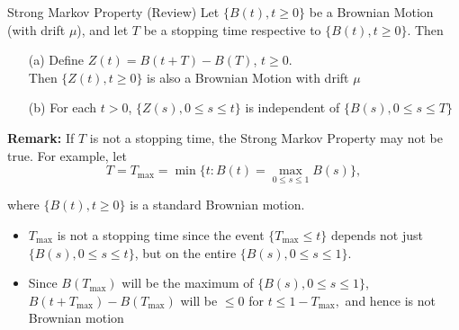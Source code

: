 \documentclass[letterpaper,handout]{beamer}
\begin{document}
\begin{frame}{Strong Markov Property (Review)}
Let $\{B(t),t\ge 0\}$ be a Brownian Motion (with drift $\mu$), and let $T$ be a stopping time respective to $\{B(t),t\ge 0\}$.
Then
\begin{itemize}
\item[(a)] Define $Z(t)=B(t+T)-B(T)$, $t\ge 0$.\\
 Then $\{Z(t), t\ge 0\}$ is also a Brownian Motion with drift $\mu$
\item[(b)] For each $t>0$, $\{Z(s), 0\le s\le t\}$ is independent of $\{B(s), 0\le s\le T\}$
\end{itemize}\medskip

\textbf{Remark:} If $T$ is not a stopping time, the Strong Markov Property may not be true.
For example, let
$$T=T_{\max}=\min\Big\{t: B(t)=\max_{0\le s\le 1}B(s)\Big\},$$\vspace{-10pt}

where $\{B(t), t \ge 0\}$ is a standard Brownian motion.
\begin{itemize}
\item $T_{\max}$ is not a stopping time since the event $\{T_{\max}\le t\}$ depends not just $\{B(s),0\le s\le t\}$, but on the entire $\{B(s),0\le s\le 1\}.$
\item Since $B(T_{\max})$ will be the maximum of $\{B(s),0\le s\le 1\}$, $B(t+T_{\max})-B(T_{\max})$ will be $\le 0$ for $t\le 1-T_{\max},$ and hence is not Brownian motion
\end{itemize}
\end{frame}
\end{document}
